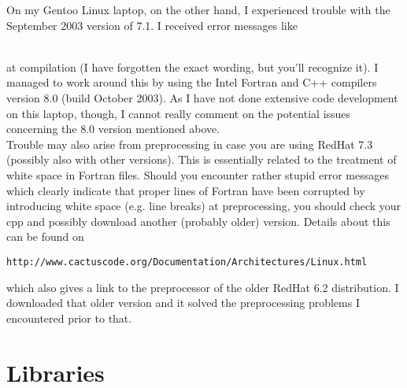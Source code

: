 \documentclass[11pt]{article}
\numberwithin{equation}{section}
\begin{document}
On my Gentoo Linux laptop, on the other hand, I experienced trouble with
the September 2003 version of 7.1.
I received error messages like\\

\hspace{1cm}{\tt struct stat stat\_bbox ...}

\hspace{1cm}{\tt Incomplete components in structure not allowed}\\

at compilation (I have forgotten the exact wording, but you'll recognize it).
I managed to work around this by using the Intel Fortran
and C++ compilers version 8.0 (build October 2003).
As I have not done extensive code development on this laptop, though,
I cannot really comment on the potential issues concerning the 8.0 version
mentioned above. \\


Trouble may also arise from preprocessing
in case you are using RedHat 7.3 (possibly also with other versions).
This is essentially related to the
treatment of white space in Fortran files.
Should you encounter rather stupid error messages which clearly indicate
that proper lines of Fortran have been corrupted by introducing white space
(e.g. line breaks) at preprocessing, you should check your cpp and possibly
download another (probably older) version.
Details about this can be found on
%
\begin{center}
  {\tt http://www.cactuscode.org/Documentation/Architectures/Linux.html}
\end{center}
%
which also gives a link to the preprocessor of the older RedHat 6.2
distribution. I downloaded that older version and it solved the preprocessing
problems I encountered prior to that. \\


\section{Libraries}
\label{sec: libraries}
\end{document}
